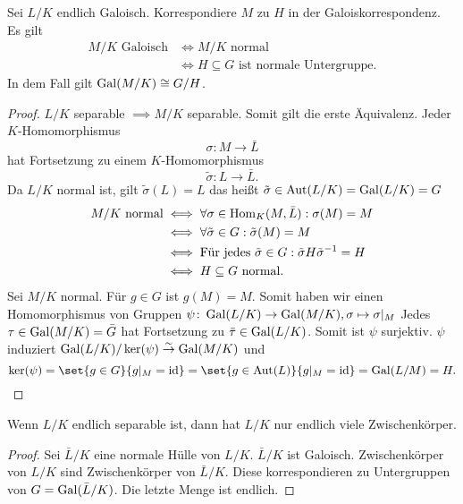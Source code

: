 \begin{Satz}
    Sei \(L/K\) endlich Galoisch. Korrespondiere \(M\) zu \(H\) in der Galoiskorrespondenz.
    Es gilt 
    \begin{align*}
        M/K \text{ Galoisch}&\iff M/K \text{ normal}\\
        & \iff H\subseteq G \text{ ist normale Untergruppe.}
    \end{align*} In dem Fall gilt \(\operatorname{Gal}(M/K)\cong G/H\).
\end{Satz}
\begin{proof}
    \(L/K\) separable \(\implies M/K\) separable. Somit gilt die erste Äquivalenz.
    Jeder \(K\)-Homomorphismus \[\sigma\colon M\to \bar L\] hat Fortsetzung zu einem \(K\)-Homomorphismus \[\tilde\sigma\colon L\to\bar L .\]  Da \(L/K\) normal ist, gilt \(\tilde\sigma(L)=L\) das heißt \(\tilde\sigma\in\operatorname{Aut}(L/K)=\operatorname{Gal}(L/K)=G\)
    \begin{align*}
        M/K \text{ normal}&\iff \forall\sigma\in\operatorname{Hom}_K(M,\bar L): \sigma(M)=M\\
        & \iff \forall\tilde\sigma\in G: \tilde\sigma(M)=M\\
        &\iff \text{Für jedes } \tilde \sigma\in G: \tilde\sigma H\tilde\sigma^{-1}=H\\
        &\iff H\subseteq G \text{ normal.}
    \end{align*}
    Sei \(M/K\) normal. Für \(g\in G\) ist \(g(M)=M\). Somit haben wir einen Homomorphismus von Gruppen 
    \(\psi\colon \operatorname{Gal}(L/K)\to\operatorname{Gal}(M/K), \sigma\mapsto \sigma|_M\)
    Jedes \(\tau\in\operatorname{Gal}(M/K)=\bar G\) hat Fortsetzung zu \(\bar\tau\in\operatorname{Gal}(L/K)\). Somit ist \(\psi\) surjektiv. \(\psi\) induziert \(\operatorname{Gal}(L/K)/\ker(\psi)\stackrel{\sim}{\to}\operatorname{Gal}(M/K)\) und 
    \[\Ker(\psi)=\set{g\in G}{ g|_M=\id}=\set{g\in\Aut(L)}{ g|_M=\id}=\Gal(L/M)=H.\]
\end{proof}
\begin{Kor}\label{Kor:SepZwischen}
    Wenn \(L/K\) endlich separable ist, dann hat \(L/K\) nur endlich viele Zwischenkörper.
\end{Kor}
\begin{proof}
    Sei \(\bar L/K\) eine normale Hülle von \(L/K\). \(\bar L/K\) ist Galoisch. Zwischenkörper von \(L/K\) sind Zwischenkörper von \(\bar L/K\). Diese korrespondieren zu Untergruppen von \(G=\operatorname{Gal}(\bar L/K)\). Die letzte Menge ist endlich.
\end{proof}
